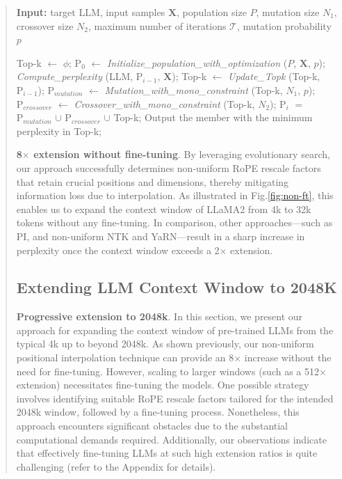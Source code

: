 \begin{abstract}
\begin{algorithm}[t]
	\small
	\caption{The search algorithm}
	\textbf{Input:} target LLM, input samples $\mathbf{X}$, population size $P$, mutation size $N_1$, crossover size $N_2$, maximum number of iterations $\mathcal{T}$, mutation probability $p$\\

	\begin{algorithmic}[1]
		\label{alg:search}
		\STATE Top-k $\leftarrow$ $\phi$;
		\STATE $\text{P}_0$ $\leftarrow$ \textit{Initialize\_population\_with\_optimization} ($P$, $\mathbf{X}$, $p$);
		\STATE \textit{Compute\_perplexity} (LLM, $\text{P}_{i-1}$, $\mathbf{X}$);
		\STATE  Top-k $\leftarrow$ \textit{Update\_Topk} (Top-k, $\text{P}_{i-1}$);
		\STATE $\text{P}_{mutation}$ $\leftarrow$ \textit{Mutation\_with\_mono\_constraint} (Top-k, $N_1$, $p$);
		\STATE $\text{P}_{crossover}$ $\leftarrow$ \textit{Crossover\_with\_mono\_constraint} (Top-k, $N_2$);
		\STATE $\text{P}_i$ $=$ $\text{P}_{mutation}$ $\cup$ $\text{P}_{crossover}$ $\cup$ Top-k;
		\ENDFOR
		\STATE Output the member with the minimum perplexity in Top-k;
	\end{algorithmic}
\end{algorithm}

\textbf{8$\times$ extension without fine-tuning}. By leveraging evolutionary search, our approach successfully determines non-uniform RoPE rescale factors that retain crucial positions and dimensions, thereby mitigating information loss due to interpolation. As illustrated in Fig.\ref{fig:non-ft}, this enables us to expand the context window of LLaMA2 from 4k to 32k tokens without any fine-tuning. In comparison, other approaches—such as PI, and non-uniform NTK and YaRN—result in a sharp increase in perplexity once the context window exceeds a 2$\times$ extension.

\subsection{Extending LLM Context Window to 2048K}
\label{sec:extendto2048k}

\textbf{Progressive extension to 2048k}. In this section, we present our approach for expanding the context window of pre-trained LLMs from the typical 4k up to beyond 2048k. As shown previously, our non-uniform positional interpolation technique can provide an 8$\times$ increase without the need for fine-tuning. However, scaling to larger windows (such as a 512$\times$ extension) necessitates fine-tuning the models. One possible strategy involves identifying suitable RoPE rescale factors tailored for the intended 2048k window, followed by a fine-tuning process. Nonetheless, this approach encounters significant obstacles due to the substantial computational demands required. Additionally, our observations indicate that effectively fine-tuning LLMs at such high extension ratios is quite challenging (refer to the Appendix for details).


\end{abstract}
